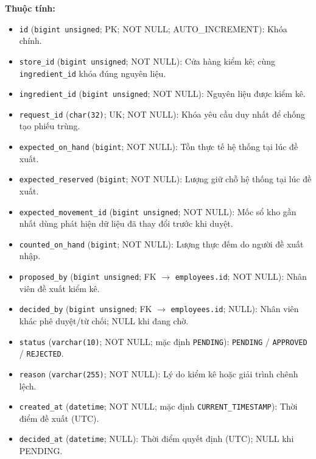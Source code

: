 \textbf{Thuộc tính:}

\begin{itemize}

\item \texttt{id} (\texttt{bigint unsigned}; PK; NOT NULL; AUTO_INCREMENT): Khóa chính.

\item \texttt{store\_id} (\texttt{bigint unsigned}; NOT NULL): Cửa hàng kiểm kê; cùng \texttt{ingredient\_id} khóa đúng nguyên liệu.

\item \texttt{ingredient\_id} (\texttt{bigint unsigned}; NOT NULL): Nguyên liệu được kiểm kê.

\item \texttt{request\_id} (\texttt{char(32)}; UK; NOT NULL): Khóa yêu cầu duy nhất để chống tạo phiếu trùng.

\item \texttt{expected\_on\_hand} (\texttt{bigint}; NOT NULL): Tồn thực tế hệ thống tại lúc đề xuất.

\item \texttt{expected\_reserved} (\texttt{bigint}; NOT NULL): Lượng giữ chỗ hệ thống tại lúc đề xuất.

\item \texttt{expected\_movement\_id} (\texttt{bigint unsigned}; NOT NULL): Mốc sổ kho gần nhất dùng phát hiện dữ liệu đã thay đổi trước khi duyệt.

\item \texttt{counted\_on\_hand} (\texttt{bigint}; NOT NULL): Lượng thực đếm do người đề xuất nhập.

\item \texttt{proposed\_by} (\texttt{bigint unsigned}; FK $\rightarrow$ \texttt{employees.id}; NOT NULL): Nhân viên đề xuất kiểm kê.

\item \texttt{decided\_by} (\texttt{bigint unsigned}; FK $\rightarrow$ \texttt{employees.id}; NULL): Nhân viên khác phê duyệt/từ chối; NULL khi đang chờ.

\item \texttt{status} (\texttt{varchar(10)}; NOT NULL; mặc định \texttt{PENDING}): \texttt{PENDING} / \texttt{APPROVED} / \texttt{REJECTED}.

\item \texttt{reason} (\texttt{varchar(255)}; NOT NULL): Lý do kiểm kê hoặc giải trình chênh lệch.

\item \texttt{created\_at} (\texttt{datetime}; NOT NULL; mặc định \texttt{CURRENT\_TIMESTAMP}): Thời điểm đề xuất (UTC).

\item \texttt{decided\_at} (\texttt{datetime}; NULL): Thời điểm quyết định (UTC); NULL khi PENDING.

\end{itemize}

